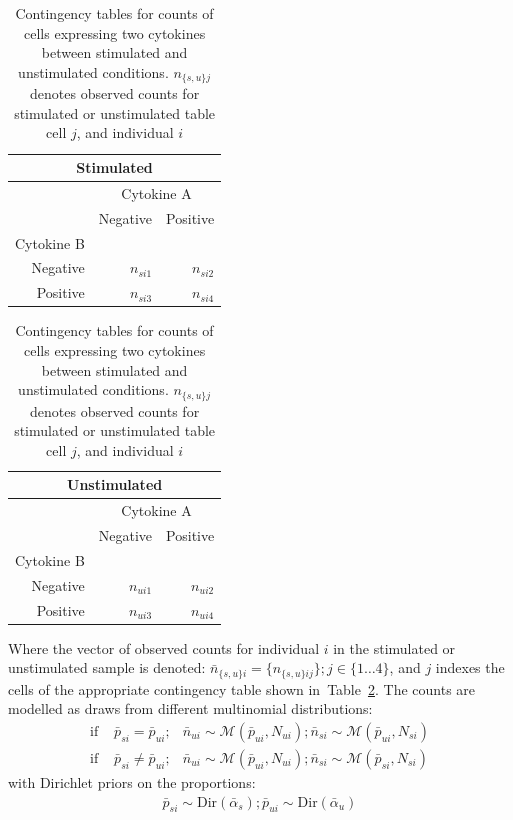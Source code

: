 \documentclass[11pt]{article}
\begin{document}
\begin{table}[ht]
\centering
\parbox{0.8\linewidth}{
\caption{Contingency tables for counts of cells expressing two cytokines between stimulated and unstimulated conditions. $n_{\{s,u\}j}$ denotes observed counts for stimulated or unstimulated table cell $j$, and individual $i$  }\label{tab:multdir}
\begin{minipage}[b]{0.5\linewidth}
\centering
\begin{tabular}{rrr}
\multicolumn{3}{c}{Stimulated}\\
  \hline
\multicolumn{1}{l}{}&
\multicolumn{2}{c}{Cytokine A}\\
 & Negative & Positive \\ 
 \multicolumn{1}{l}{Cytokine B}&&\\
  \hline
Negative &   $n_{si1}$ &   $n_{si2}$ \\ 
Positive &   $n_{si3}$ &   $n_{si4}$ \\ 
   \hline
\end{tabular}
\end{minipage}
\begin{minipage}[b]{0.5\linewidth}
\centering
\begin{tabular}{rrr}
\multicolumn{3}{c}{Unstimulated}\\
  \hline
\multicolumn{1}{l}{}&
\multicolumn{2}{c}{Cytokine A}\\
 & Negative & Positive \\ 
 \multicolumn{1}{l}{Cytokine B}&&\\
  \hline
Negative &   $n_{ui1}$ &   $n_{ui2}$ \\ 
Positive &   $n_{ui3}$ &   $n_{ui4}$ \\ 
   \hline
\end{tabular}
\end{minipage}
}
\end{table}

Where the vector of observed counts for individual $i$ in the stimulated or unstimulated sample is denoted: $\bar{n}_{\{s,u\}i} = \{n_{\{s,u\}ij}\} ; j\in\{1\ldots 4\}$, and $j$ indexes the cells of the appropriate contingency table shown in~Table~\ref{tab:multdir}. The counts are modelled as draws from different multinomial distributions:
\begin{align}
\text{if } & \bar{p}_{si}=\bar{p}_{ui};& \bar{n}_{ui} \sim \mathcal{M}(\bar{p}_{ui},N_{ui});\bar{n}_{si} \sim \mathcal{M}(\bar{p}_{ui},N_{si})\\
\text{if } & \bar{p}_{si} \ne \bar{p}_{ui};& \bar{n}_{ui} \sim \mathcal{M}(\bar{p}_{ui},N_{ui});\bar{n}_{si} \sim \mathcal{M}(\bar{p}_{si},N_{si})
\end{align}
with Dirichlet priors on the proportions:
\begin{align}
\bar{p}_{si} \sim \mathrm{Dir}(\bar{\alpha}_s) ; \bar{p}_{ui} \sim \mathrm{Dir}(\bar{\alpha}_u)
\end{align}
\end{document}
